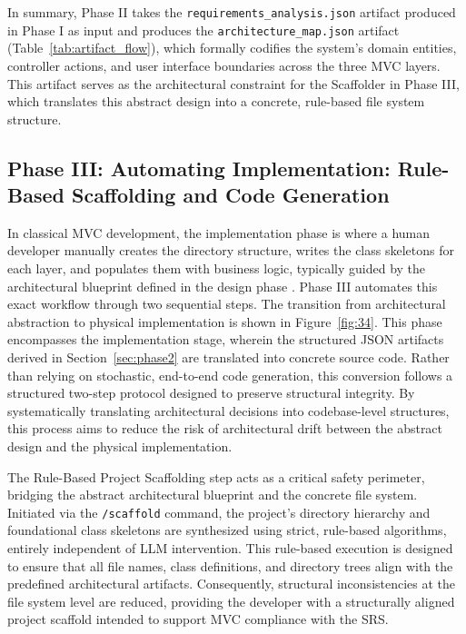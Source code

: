 In summary, Phase II takes the \texttt{requirements\_analysis.json} artifact produced in Phase I as input and produces the \texttt{architecture\_map.json} artifact (Table~\ref{tab:artifact_flow}), which formally codifies the system's domain entities, controller actions, and user interface boundaries across the three MVC layers. This artifact serves as the architectural constraint for the Scaffolder in Phase III, which translates this abstract design into a concrete, rule-based file system structure.

\FloatBarrier
\subsection{Phase III: Automating Implementation: Rule-Based Scaffolding and Code Generation}
\label{sec:phase3}

In classical MVC development, the implementation phase is where a human developer manually creates the directory structure, writes the class skeletons for each layer, and populates them with business logic, typically guided by the architectural blueprint defined in the design phase \citep{Gamma1994}. Phase III automates this exact workflow through two sequential steps. The transition from architectural abstraction to physical implementation is shown in Figure~\ref{fig:34}. This phase encompasses the implementation stage, wherein the structured JSON artifacts derived in Section~\ref{sec:phase2} are translated into concrete source code. Rather than relying on stochastic, end-to-end code generation, this conversion follows a structured two-step protocol designed to preserve structural integrity. By systematically translating architectural decisions into codebase-level structures, this process aims to reduce the risk of architectural drift between the abstract design and the physical implementation.


The Rule-Based Project Scaffolding step acts as a critical safety perimeter, bridging the abstract architectural blueprint and the concrete file system. Initiated via the \texttt{/scaffold} command, the project's directory hierarchy and foundational class skeletons are synthesized using strict, rule-based algorithms, entirely independent of LLM intervention. This rule-based execution is designed to ensure that all file names, class definitions, and directory trees align with the predefined architectural artifacts. Consequently, structural inconsistencies at the file system level are reduced, providing the developer with a structurally aligned project scaffold intended to support MVC compliance with the SRS.

